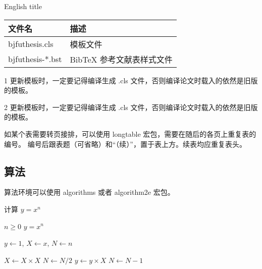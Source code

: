 \begin{table}[h]
	\xiaowu
	\centering
	\begin{threeparttable}[c]
		 {English title}
		\label{tab:three-part-table}
		\begin{tabular}{ll}
			\toprule
			文件名                     & 描述                      \\
			\midrule
			bjfuthesis.cls\tnote{1}    & 模板文件                  \\
			bjfuthesis-*.bst \tnote{2} & BibTeX 参考文献表样式文件 \\
			\bottomrule
		\end{tabular}
		\begin{tablenotes}

			\item [1] 更新模板时，一定要记得编译生成 .cls 文件，否则编译论文时载入的依然是旧版的模板。
			\item [2] 更新模板时，一定要记得编译生成 .cls 文件，否则编译论文时载入的依然是旧版的模板。
		\end{tablenotes}
	\end{threeparttable}
\end{table}

如某个表需要转页接排，可以使用 longtable 宏包，需要在随后的各页上重复表的编号。
编号后跟表题（可省略）和“（续）”，置于表上方。续表均应重复表头。


\subsection{算法}

算法环境可以使用 algorithms 或者 algorithm2e 宏包。
\renewcommand{\algorithmicrequire}{\textbf{输入：}\unskip}
\renewcommand{\algorithmicensure}{\textbf{输出：}\unskip}

\begin{algorithm}[ht]
	\caption{计算 $y = x^n$}
	\label{alg1}
	\small
	\begin{algorithmic}
		\REQUIRE $n \geq 0$
		\ENSURE $y = x^n$

		\STATE $y \leftarrow 1$, $X \leftarrow x$, $N \leftarrow n$

		\STATE $X \leftarrow X \times X$
		\STATE $N \leftarrow N / 2$
		\ELSE[$N$ is odd]
		\STATE $y \leftarrow y \times X$
		\STATE $N \leftarrow N - 1$
		\ENDIF
		\ENDWHILE
	\end{algorithmic}
\end{algorithm}